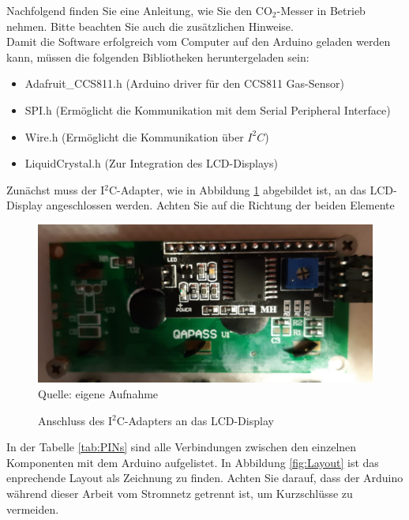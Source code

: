 \label{Installationsanleitung}

Nachfolgend finden Sie eine Anleitung, wie Sie den CO$_2$-Messer in Betrieb nehmen. Bitte beachten Sie auch die zusätzlichen Hinweise. \\
Damit die Software erfolgreich vom Computer auf den Arduino geladen werden kann, müssen die folgenden Bibliotheken heruntergeladen sein:

\begin{itemize}
	\item Adafruit\_CCS811.h (Arduino driver für den CCS811 Gas-Sensor)
	\item SPI.h (Ermöglicht die Kommunikation mit dem Serial Peripheral Interface)
	\item Wire.h (Ermöglicht die Kommunikation über $I^2C$)
	\item LiquidCrystal.h (Zur Integration des \ac{LCD}-Displays)
\end{itemize}

Zunächst muss der I$^2$C-Adapter, wie in Abbildung \ref{fig:I2C} abgebildet ist, an das \ac{LCD}-Display angeschlossen werden. Achten Sie auf die Richtung der beiden Elemente \\

\begin{figure}[!hbt]
	\centering
	\includegraphics[width=0.6\linewidth]{Images/I2C}
	\footnotesize \\Quelle: eigene Aufnahme
	\caption{Anschluss des I$^2$C-Adapters an das \ac{LCD}-Display}
	\label{fig:I2C}
\end{figure}

In der Tabelle \ref{tab:PINs} sind alle Verbindungen zwischen den einzelnen Komponenten mit dem Arduino aufgelistet. In Abbildung \ref{fig:Layout} ist das enprechende Layout als Zeichnung zu finden. Achten Sie darauf, dass der Arduino während dieser Arbeit vom Stromnetz getrennt ist, um Kurzschlüsse zu vermeiden.

